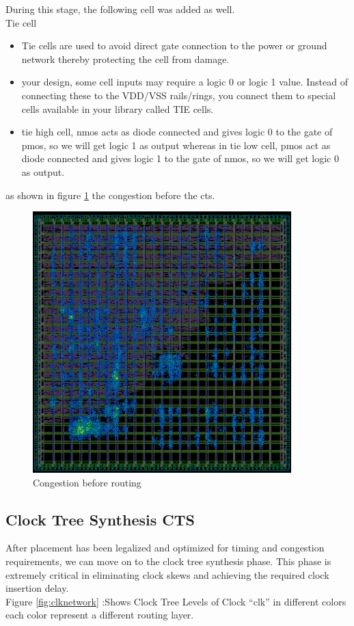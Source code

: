 \documentclass[../main.tex]{subfiles}
\begin{document}
During this stage, the following cell was added as well.\\
Tie cell
\begin{itemize}
  \item Tie cells are used to avoid direct gate connection to the power or ground network thereby protecting the cell from damage.
\item your design, some cell inputs may require a logic 0 or logic 1 value. Instead of connecting these to the VDD/VSS rails/rings, you connect them to special cells available in your library called TIE cells.
\item tie high cell, nmos acts as diode connected and gives logic 0 to the gate of pmos, so we will get logic 1 as output whereas in tie low cell, pmos act as diode connected and gives logic 1 to the gate of nmos, so we will get logic 0 as output.
\end{itemize}
as shown in figure \ref{fig:congestion} 
the congestion before the cts.
\begin{figure}[h]
    \centering
    \includegraphics[width=10cm]{diagrams/global_routing_congestion_before_routing.png}
    \caption{Congestion before routing}
    \label{fig:congestion}
\end{figure}
\newpage \subsection{Clock Tree Synthesis CTS} 
After placement has been legalized and optimized for timing and congestion requirements, we can
move on to the clock tree synthesis phase. This phase is extremely critical in eliminating clock
skews and achieving the required clock insertion delay.\\
Figure \ref{fig:clknetwork} :Shows Clock Tree Levels of
Clock “clk”  in different colors each color represent a different routing layer.\\
\end{document}
